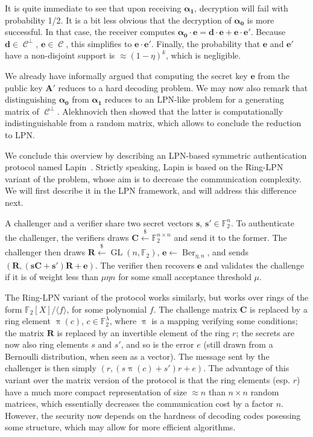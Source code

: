 \documentclass[11pt,a4paper]{article}
\theoremstyle{definition}
\DeclareMathOperator\code{\mathcal{C}}
\DeclareMathOperator\Ber{Ber}
\DeclareMathOperator\gl{GL}
\DeclareMathOperator\proj{\pi}
\newcommand\ftwo{\mathbb{F}_{2}}
\newcommand\randraw{\xleftarrow{{\scriptscriptstyle\$}}}
\begin{document}
It is quite immediate to see that upon receiving $\bm{\alpha_1}$, decryption will fail with probability 1/2. It is a bit less obvious that the decryption
of $\bm{\alpha_0}$ is more successful. In that case, the receiver computes $\bm{\alpha_0} \cdot \bm{e} = \bm{d}\cdot\bm{e} + \bm{e}\cdot\bm{e}'$. Because
$\bm{d} \in \code^\bot$, $\bm{e} \in \code$, this simplifies to $\bm{e}\cdot\bm{e}'$. Finally, the probability that $\bm{e}$ and $\bm{e}'$ have a non-disjoint
support is $\approx (1-\eta)^k$, which is negligible.

We already have informally argued that computing the secret key $\bm{e}$ from the public key $\bm{A}'$ reduces to a hard decoding problem. We may now also
remark that distinguishing $\bm{\alpha_0}$ from $\bm{\alpha_1}$ reduces to an LPN-like problem for a generating matrix of $\code^\bot$. Alekhnovich then
showed that the latter is computationally indistinguishable from a random matrix, which allows to conclude the reduction to LPN.

\medskip

We conclude this overview by describing an LPN-based symmetric authentication protocol named Lapin~\cite{lapin}. Strictly speaking, Lapin is based on the Ring-LPN variant
of the problem, whose aim is to decrease the communication complexity. We will first describe it in the LPN framework, and will address this difference next.

A challenger and a verifier share two secret vectors $\bm{s}$, $\bm{s}' \in \ftwo^n$. To authenticate the challenger, the verifiers draws $\bm{C} \randraw \ftwo^{n\times n}$
and send it to the former. The challenger then draws $\bm{R} \randraw \gl(n, \ftwo)$, $\bm{e} \leftarrow \Ber_{\eta,n}$, and sends $(\bm{R}, (\bm{s}\bm{C} + \bm{s}')\bm{R} + \bm{e})$.
The verifier then recovers $\bm{e}$ and validates the challenge if it is of weight less than $\mu \eta n$ for some small acceptance threshold $\mu$.

The Ring-LPN variant of the protocol works similarly, but works over rings of the form $\ftwo[X]/\langle f \rangle$, for some polynomial $f$. The challenge matrix $\bm{C}$
is replaced by a ring element $\proj(c)$, $c \in \ftwo^\lambda$, where $\proj$ is a mapping verifying some conditions; the matrix $\bm{R}$ is replaced by an invertible
element of the ring $r$; the secrets are now also ring elements $s$ and $s'$, and so is the error $e$ (still drawn from a Bernoulli distribution, when seen as a vector).
The message sent by the challenger is then simply $(r, (s\proj(c) + s')r + e)$. The advantage of this variant over the matrix version of the protocol is that the ring elements
(esp. $r$) have a much more compact representation of size $\approx n$ than $n\times n$ random matrices, which essentially decreases the communication cost by a factor $n$.
However, the security now depends on the hardness of decoding codes posessing some structure, which may allow for more efficient algorithms.
\end{document}
